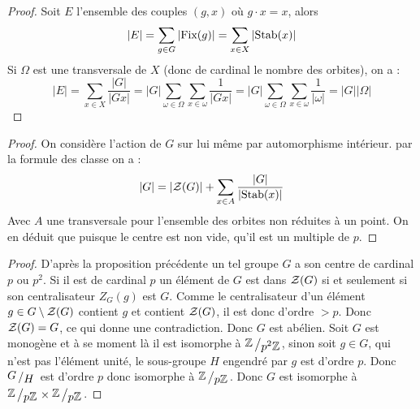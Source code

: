 \begin{proof}
	Soit $E$ l'ensemble des couples $(g,x)$ où $g\cdot x = x$, alors
	\[
		\vert E \vert = \sum_{g \in G}\vert \textup{Fix}(g)\vert = \sum_{x\in X} \vert \textup{Stab}(x) \vert
	\]
	Si $\Omega$ est une transversale de $X$ (donc de cardinal le nombre des orbites), on a :
	\[ 
		\vert E \vert = \sum_{x \in X} \frac{\vert G\vert}{\vert Gx\vert } = \vert G \vert \sum_{ \omega \in \Omega}  \sum_{ x \in \omega} 	\frac{1}{\vert Gx\vert} = \vert G \vert \sum_{ \omega \in \Omega}  \sum_{ x \in \omega} \frac{1}{\vert \omega\vert}  = \vert G  \vert \vert \Omega \vert 
	\]
\end{proof}



\begin{proof} 
	On considère l'action de $G$ sur lui même par automorphisme intérieur. par la formule des classe on a :
	\[
		\vert G \vert = \vert \mathcal{Z}(G) \vert + \sum_{x\in A} \frac{\vert G \vert}{\vert \textup{Stab}(x) \vert }
	\]
	Avec $A$ une transversale pour l'ensemble des orbites non réduites à un point. On en déduit que puisque le centre est non vide, qu'il est un multiple de $p$.
\end{proof}



\begin{proof} 
	D'après la proposition précédente un tel groupe $G$ a son centre de cardinal $p$ ou $p^2$. Si il est de cardinal $p$ un élément de $G$ est dans $\mathcal{Z}(G)$ si et seulement si son centralisateur $Z_G(g)$ est $G$. Comme le centralisateur d'un élément $g \in G\setminus \mathcal{Z}(G)$ contient $g$ et contient $\mathcal{Z}(G)$, il est donc d'ordre $>p$. Donc $\mathcal{Z}(G)= G$, ce qui donne une contradiction. Donc $G$ est abélien. Soit $G$ est monogène et à se moment là il est isomorphe à $\bigslant{\ZZ}{p^2\ZZ}$, sinon soit $g \in G$, qui n'est pas l'élément unité, le sous-groupe $H$ engendré par $g$ est d'ordre $p$. Donc $\bigslant{G}{H}$ est d'ordre $p$ donc isomorphe à $\bigslant{\ZZ}{p\ZZ}$. Donc $G$ est isomorphe à $\bigslant{\ZZ}{p\ZZ} \times \bigslant{\ZZ}{p\ZZ}$.
\end{proof}
